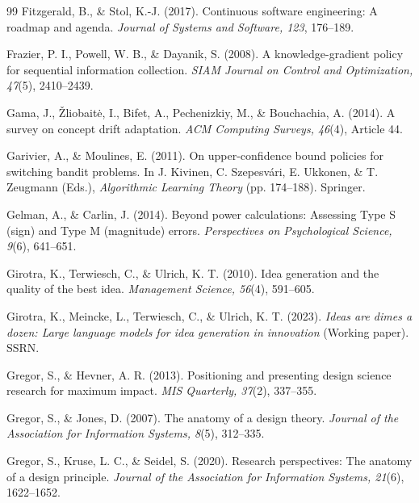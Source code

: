 \begin{thebibliography}{99}
 Fitzgerald, B., \& Stol, K.-J. (2017). Continuous software engineering: A roadmap and agenda. \textit{Journal of Systems and Software, 123}, 176--189. 

 Frazier, P. I., Powell, W. B., \& Dayanik, S. (2008). A knowledge-gradient policy for sequential information collection. \textit{SIAM Journal on Control and Optimization, 47}(5), 2410--2439. 

 Gama, J., {\v{Z}}liobait{\.e}, I., Bifet, A., Pechenizkiy, M., \& Bouchachia, A. (2014). A survey on concept drift adaptation. \textit{ACM Computing Surveys, 46}(4), Article 44. 

 Garivier, A., \& Moulines, E. (2011). On upper-confidence bound policies for switching bandit problems. In J. Kivinen, C. Szepesv{\'a}ri, E. Ukkonen, \& T. Zeugmann (Eds.), \textit{Algorithmic Learning Theory} (pp. 174--188). Springer. 

 Gelman, A., \& Carlin, J. (2014). Beyond power calculations: Assessing Type S (sign) and Type M (magnitude) errors. \textit{Perspectives on Psychological Science, 9}(6), 641--651. 

 Girotra, K., Terwiesch, C., \& Ulrich, K. T. (2010). Idea generation and the quality of the best idea. \textit{Management Science, 56}(4), 591--605. 

 Girotra, K., Meincke, L., Terwiesch, C., \& Ulrich, K. T. (2023). \textit{Ideas are dimes a dozen: Large language models for idea generation in innovation} (Working paper). SSRN. 

 Gregor, S., \& Hevner, A. R. (2013). Positioning and presenting design science research for maximum impact. \textit{MIS Quarterly, 37}(2), 337--355. 

 Gregor, S., \& Jones, D. (2007). The anatomy of a design theory. \textit{Journal of the Association for Information Systems, 8}(5), 312--335. 

 Gregor, S., Kruse, L. C., \& Seidel, S. (2020). Research perspectives: The anatomy of a design principle. \textit{Journal of the Association for Information Systems, 21}(6), 1622--1652. 


\end{thebibliography}
